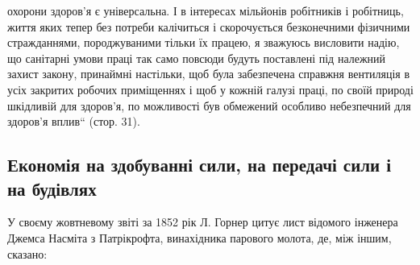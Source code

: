 \parcont{}  %
охорони здоров’я є універсальна. І в інтересах мільйонів робітників і робітниць, життя яких тепер
без потреби калічиться
і скорочується безконечними фізичними стражданнями, породжуваними тільки їх працею, я зважуюсь
висловити надію, що
санітарні умови праці так само повсюди будуть поставлені під
належний захист закону, принаймні настільки, щоб була забезпечена справжня вентиляція в усіх
закритих робочих приміщеннях і щоб у кожній галузі праці, по своїй природі шкідливій для здоров’я,
по можливості був обмежений особливо
небезпечний для здоров’я вплив“ (стор. 31).

\subsection{Економія на здобуванні сили, на передачі сили і на будівлях}

У своєму жовтневому звіті за 1852 рік Л. Горнер цитує лист
відомого інженера Джемса Насміта з Патрікрофта, винахідника
парового молота, де, між іншим, сказано:

